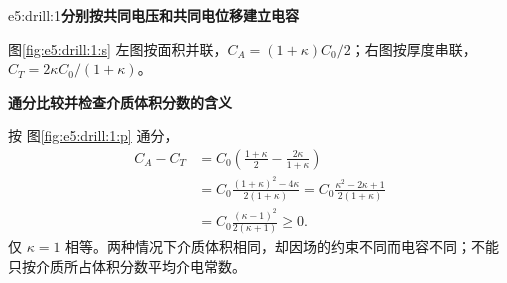 \LectureAnswerSection

\begin{drillsolution}{e5:drill:1}\textbf{分别按共同电压和共同电位移建立电容}\par\nobreak
图\ref{fig:e5:drill:1:s} 左图按面积并联，$C_A=(1+\kappa)C_0/2$；右图按厚度串联，$C_T=2\kappa C_0/(1+\kappa)$。



\par\medskip{}\noindent\textbf{通分比较并检查介质体积分数的含义}\par\nobreak
按 图\ref{fig:e5:drill:1:p} 通分，
\[
\begin{aligned}
C_A-C_T&=C_0\left(\frac{1+\kappa}{2}-\frac{2\kappa}{1+\kappa}\right)\\
&=C_0\frac{(1+\kappa)^2-4\kappa}{2(1+\kappa)}
=C_0\frac{\kappa^2-2\kappa+1}{2(1+\kappa)}\\
&=C_0\frac{(\kappa-1)^2}{2(\kappa+1)}\ge0.
\end{aligned}
\]
仅 $\kappa=1$ 相等。两种情况下介质体积相同，却因场的约束不同而电容不同；不能只按介质所占体积分数平均介电常数。\end{drillsolution}
